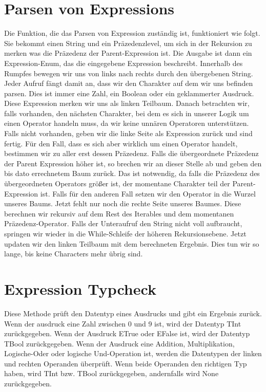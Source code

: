 \documentclass[a4paper, 1ppt]{article}
\begin{document}
\section{Parsen von Expressions}
Die Funktion, die das Parsen von Expression zuständig ist, funktioniert wie folgt.
Sie bekommt einen String und ein Präzedenzlevel, um sich in der Rekursion zu merken
was die Präzedenz der Parent-Expression ist. Die Ausgabe ist dann ein Expression-Enum, das die eingegebene Expression beschreibt.
Innerhalb des Rumpfes bewegen wir uns von links nach rechts durch den übergebenen String.
Jeder Aufruf fängt damit an, dass wir den Charakter auf dem wir uns befinden parsen.
Dies ist immer eine Zahl, ein Boolean oder ein geklammerter Ausdruck. 
Diese Expression merken wir uns als linken Teilbaum.
Danach betrachten wir, falls vorhanden, den nächsten Charakter, bei dem es sich in unserer Logik um einen Operator handeln muss, 
da wir keine unnären Operatoren unterstützen. Falls nicht vorhanden, geben wir die linke Seite als Expression zurück und sind fertig.
Für den Fall, dass es sich aber wirklich um einen Operator handelt, bestimmen wir zu aller erst dessen Präzedenz.
Falls die übergeordnete Präzedenz der Parent Expression höher ist, so brechen wir an dieser Stelle ab und geben den bis dato errechnetem Baum zurück.
Das ist notwendig, da falls die Präzedenz des übergeordneten Operators größer ist, der momentane Charakter teil der Parent-Expression ist.
Falls für den anderen Fall setzen wir den Operator in die Wurzel unseres Baums. 
Jetzt fehlt nur noch die rechte Seite unseres Baumes.
Diese berechnen wir rekursiv auf dem Rest des Iterables und dem momentanen Präzedenz-Operator.
Falls der Unteraufruf den String nicht voll aufbraucht, springen wir wieder in die While-Schleife der höheren Rekursionsebene.
Jetzt updaten wir den linken Teilbaum mit dem berechneten Ergebnis.
Dies tun wir so lange, bis keine Characters mehr übrig sind.
\newpage
\section{Expression Typcheck}
Diese Methode prüft den Datentyp eines Ausdrucks und gibt ein Ergebnis zurück.
Wenn der ausdruck eine Zahl zwischen 0 und 9 ist, wird der Datentyp TInt zurückgegeben.
Wenn der Ausdruck ETrue oder EFalse ist, wird der Datentyp TBool zurückgegeben.
Wenn der Ausdruck eine Addition, Multiplikation, Logische-Oder oder logische Und-Operation ist, werden die Datentypen der linken und rechten Operanden überprüft.
Wenn beide Operanden den richtigen Typ haben, wird TInt bzw.
TBool zurückgegeben, andernfalls wird None zurückgegeben.
\end{document}
